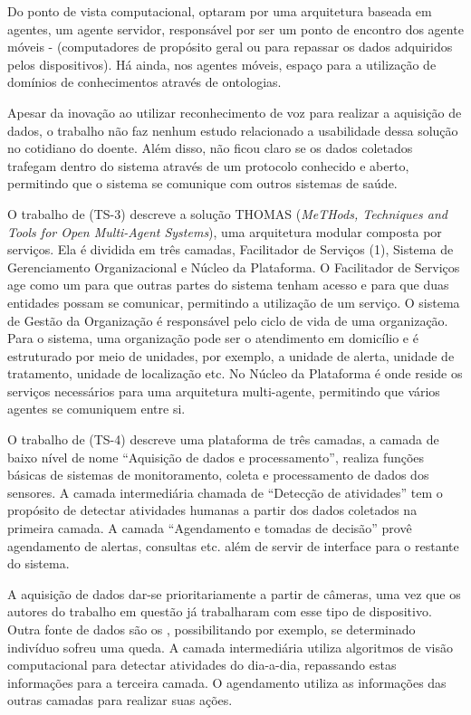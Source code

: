 Do ponto de vista computacional,  optaram
por uma arquitetura baseada em agentes, um agente servidor, responsável por ser
um ponto de encontro dos agente móveis - (computadores de propósito geral ou
\smartphones[] para repassar os dados adquiridos pelos dispositivos). Há ainda,
nos agentes móveis, espaço para a utilização de domínios de conhecimentos
através de ontologias.
 
Apesar da inovação ao utilizar reconhecimento de voz para realizar a aquisição
de dados, o trabalho não faz nenhum estudo relacionado a usabilidade dessa
solução no cotidiano do doente. Além disso, não ficou claro se os dados
coletados trafegam dentro do sistema através de um protocolo conhecido e
aberto, permitindo que o sistema se comunique com outros sistemas de saúde.

O trabalho de  (TS-3) descreve a solução THOMAS
(\textit{MeTHods, Techniques and Tools for Open Multi-Agent Systems}), uma
arquitetura modular composta por serviços. Ela é dividida em três camadas,
Facilitador de Serviços (1), Sistema de Gerenciamento Organizacional e Núcleo
da Plataforma. O Facilitador de Serviços age como um \gateway[] para que outras
partes do sistema tenham acesso e para que duas entidades possam se comunicar,
permitindo a utilização de um serviço. O sistema de Gestão da Organização é
responsável pelo ciclo de vida de uma organização. Para o sistema, uma
organização pode ser o atendimento em domicílio e é estruturado por meio de
unidades, por exemplo, a unidade de alerta, unidade de tratamento, unidade de
localização  etc. No Núcleo da Plataforma é onde reside os serviços necessários
para uma arquitetura multi-agente, permitindo que vários agentes se comuniquem
entre si.

O trabalho de  (TS-4) descreve uma plataforma de três
camadas, a camada de baixo nível de nome ``Aquisição de dados e
processamento'', realiza funções básicas de sistemas de monitoramento, coleta e
processamento de dados dos sensores. A camada intermediária chamada de
``Detecção de atividades'' tem o propósito de detectar atividades humanas a
partir dos dados coletados na primeira camada. A camada ``Agendamento e tomadas
de decisão'' provê agendamento de alertas, consultas etc.  além de servir de
interface para o restante do sistema.

A aquisição de dados dar-se prioritariamente a partir de câmeras, uma vez que
os autores do trabalho em questão já trabalharam com esse tipo de dispositivo.
Outra fonte de dados são os \smartphones, possibilitando por exemplo, se
determinado indivíduo sofreu uma queda. A camada intermediária utiliza
algoritmos de visão computacional para detectar atividades do dia-a-dia,
repassando estas informações para a terceira camada. O agendamento utiliza as
informações das outras camadas para realizar suas ações. 

